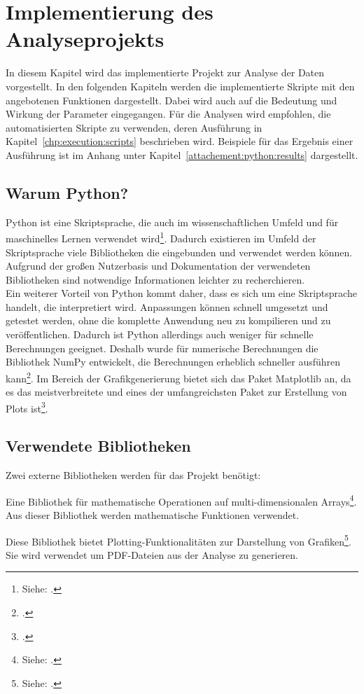 \chapter{Implementierung des Analyseprojekts}
\label{chp:python:implementation}
In diesem Kapitel wird das implementierte Projekt zur Analyse der Daten vorgestellt.
In den folgenden Kapiteln werden die implementierte Skripte mit den angebotenen Funktionen dargestellt. 
Dabei wird auch auf die Bedeutung und Wirkung der Parameter eingegangen.
Für die Analysen wird empfohlen, die automatisierten Skripte zu verwenden, deren Ausführung in Kapitel~\ref{chp:execution:scripts} beschrieben wird.
Beispiele für das Ergebnis einer Ausführung ist im Anhang unter Kapitel~\ref{attachement:python:results} dargestellt.

\section{Warum Python?}
Python ist eine Skriptsprache, die auch im wissenschaftlichen Umfeld und für maschinelles Lernen verwendet wird\footnote{ Siehe: \cite{Fuxjaeger2017}.}.
Dadurch existieren im Umfeld der Skriptsprache viele Bibliotheken die eingebunden und verwendet werden können.
Aufgrund der großen Nutzerbasis und Dokumentation der verwendeten Bibliotheken sind notwendige Informationen leichter zu recherchieren.\\
Ein weiterer Vorteil von Python kommt daher, dass es sich um eine Skriptsprache handelt, die interpretiert wird.
Anpassungen können schnell umgesetzt und getestet werden, ohne die komplette Anwendung neu zu kompilieren und zu veröffentlichen.
Dadurch ist Python allerdings auch weniger für schnelle Berechnungen geeignet.
Deshalb wurde für numerische Berechnungen die Bibliothek NumPy entwickelt, die Berechnungen erheblich schneller ausführen kann\footnote{ \cite[vgl.][S.173f]{Woyand2017}.}.
Im Bereich der Grafikgenerierung bietet sich das Paket Matplotlib an, da es das meistverbreitete und eines der umfangreichsten Paket zur Erstellung von Plots ist\footnote{ \cite[vgl.][S.45]{Rossant2013}.}.

\section{Verwendete Bibliotheken}
Zwei externe Bibliotheken werden für das Projekt benötigt:
\begin{description}[style=nextline]
	\item[NumPy] Eine Bibliothek für mathematische Operationen auf multi-dimensionalen Arrays\footnote{ Siehe: \cite{Athanasias2014}.}. Aus dieser Bibliothek werden mathematische Funktionen verwendet.
	\item[Matplotlib] Diese Bibliothek bietet Plotting-Funktionalitäten zur Darstellung von Grafiken\footnote{ Siehe: \cite{Matplotlib2019}.}. Sie wird verwendet um PDF-Dateien aus der Analyse zu generieren.
\end{description}
